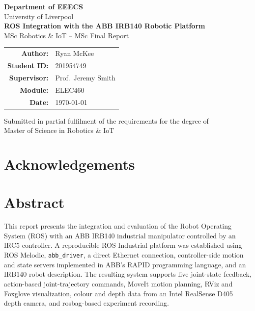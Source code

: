 \documentclass[11pt,a4paper]{report}
\begin{document}

\begin{titlepage}
  \thispagestyle{empty}
  \centering
  \vspace*{2cm}

  {\Large \textbf{Department of EEECS}}\\[0.5cm]
  {\large University of Liverpool}\\[3cm]

  {\LARGE \textbf{ROS Integration with the ABB IRB140 Robotic Platform}}\\[1cm]
  {\large MSc Robotics \& IoT -- MSc Final Report}\\[3cm]

  \begin{tabular}{rl}
    \textbf{Author:}     & Ryan McKee \\[4pt]
    \textbf{Student ID:} & 201954749  \\[4pt]
    \textbf{Supervisor:} & Prof.\ Jeremy Smith \\[4pt]
    \textbf{Module:}     & ELEC460 \\[4pt]
    \textbf{Date:}       & \today \\
  \end{tabular}

  \vfill
  {\small Submitted in partial fulfilment of the requirements for the degree of\\ Master of Science in Robotics \& IoT}
\end{titlepage}
\clearpage


\chapter*{Acknowledgements}

\chapter*{Abstract}

This report presents the integration and evaluation of the Robot Operating System (ROS) with an
ABB IRB140 industrial manipulator controlled by an IRC5 controller. A reproducible ROS-Industrial
platform was established using ROS Melodic, \texttt{abb\_driver}, a direct Ethernet connection,
controller-side motion and state servers implemented in ABB's RAPID programming language, and an
IRB140 robot description. The resulting system supports live joint-state feedback, action-based
joint-trajectory commands, MoveIt motion planning, RViz and Foxglove visualization, colour and
depth data from an Intel RealSense D405 depth camera, and rosbag-based experiment recording.
\end{document}
